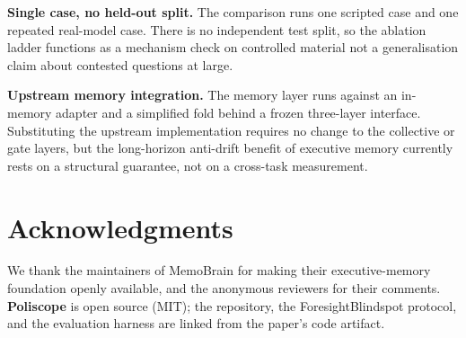 \textbf{Single case, no held-out split.} The comparison runs one scripted
case and one repeated real-model case. There is no independent test split,
so the ablation ladder functions as a mechanism check on controlled material
not a generalisation claim about contested questions at large.

\textbf{Upstream memory integration.} The memory layer runs against an
in-memory adapter and a simplified fold behind a frozen three-layer
interface. Substituting the upstream implementation requires no change to the
collective or gate layers, but the long-horizon anti-drift benefit of
executive memory currently rests on a structural guarantee, not on a
cross-task measurement.

\section*{Acknowledgments}

We thank the maintainers of MemoBrain for making their executive-memory
foundation openly available, and the anonymous reviewers for their comments.
\textbf{Poliscope} is open source (MIT); the repository, the
ForesightBlindspot protocol, and the evaluation harness are linked from the
paper's code artifact.

